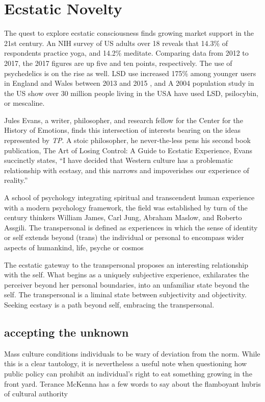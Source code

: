 \documentclass{UIdahoMastersThesis}
\begin{document}
 
\section{Ecstatic Novelty}

The quest to explore ecstatic consciousness finds growing market support in the 21st century. An NIH survey of US adults over 18 reveals that 14.3\% of respondents practice yoga, and 14.2\% meditate.  Comparing data from 2012 to 2017, the 2017 figures are up five and ten points, respectively. The use of psychedelics is on the rise as well. LSD use increased 175\% among younger users in England and Wales between 2013 and 2015 \cite{gayle_ecstasy_2015}, and A 2004 population study in the US show over 30 million people living in the USA have used LSD, psilocybin, or mescaline. \cite{krebs_psychedelics_2013}

Jules Evans, a writer, philosopher, and research fellow for the Center for the History of Emotions, finds this intersection of interests bearing on the ideas represented by \textit{\ac{TP}}. A stoic philosopher, he never-the-less pens his second book publication, The Art of Losing Control: A Guide to Ecstatic Experience, Evans succinctly states, \enquote{I have decided that Western culture has a problematic relationship with ecstasy, and this narrows and impoverishes our experience of reality.}

A school of psychology integrating spiritual and transcendent human experience with a modern psychology framework, the field was established by turn of the century thinkers William James, Carl Jung, Abraham Maslow, and Roberto Assgili. The transpersonal is defined as experiences in which the sense of identity or self extends beyond (trans) the individual or personal to encompass wider aspects of humankind, life, psyche or cosmos \cite{calijornia1993transpersonal}

The ecstatic gateway to the transpersonal proposes an interesting relationship with the self. What begins as a uniquely subjective experience, exhilarates the perceiver beyond her personal boundaries, into an unfamiliar state beyond the self. The transpersonal is a liminal state between subjectivity and objectivity. Seeking ecstasy is a path beyond self, embracing the transpersonal.

\subsection{accepting the unknown}

Mass culture conditions individuals to be wary of deviation from the norm. While this is a clear tautology, it is nevertheless a useful note when questioning how public policy can prohibit an individual's right to eat something growing in the front yard. Terance McKenna has a few words to say about the flamboyant hubris of cultural authority
\end{document}
